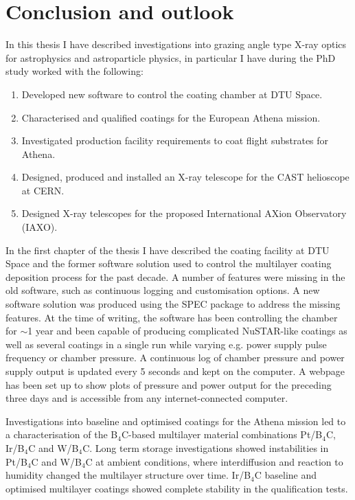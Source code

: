 \chapter{Conclusion and outlook}
In this thesis I have described investigations into grazing angle type X-ray optics for astrophysics and astroparticle physics, in particular I have during the PhD study worked with the following:

\begin{enumerate}
  \item Developed new software to control the coating chamber at DTU Space.
  \item Characterised and qualified coatings for the European Athena mission.
  \item Investigated production facility requirements to coat flight substrates for Athena.
  \item Designed, produced and installed an X-ray telescope for the CAST helioscope at CERN.
  \item Designed X-ray telescopes for the proposed International AXion Observatory (IAXO).
\end{enumerate}

In the first chapter of the thesis I have described the coating facility at DTU Space and the former software solution used to control the multilayer coating deposition process for the past decade. A number of features were missing in the old software, such as continuous logging and customisation options. A new software solution was produced using the SPEC package to address the missing features. At the time of writing, the software has been controlling the chamber for $\sim$1 year and been capable of producing complicated NuSTAR-like coatings as well as several coatings in a single run while varying e.g. power supply pulse frequency or chamber pressure. A continuous log of chamber pressure and power supply output is updated every 5 seconds and kept on the computer. A webpage has been set up to show plots of pressure and power output for the preceding three days and is accessible from any internet-connected computer.

Investigations into baseline and optimised coatings for the Athena mission led to a characterisation of the B$_4$C-based multilayer material combinations Pt/B$_4$C, Ir/B$_4$C and W/B$_4$C. Long term storage investigations showed instabilities in Pt/B$_4$C and W/B$_4$C at ambient conditions, where interdiffusion and reaction to humidity changed the multilayer structure over time. Ir/B$_4$C baseline and optimised multilayer coatings showed complete stability in the qualification tests.

